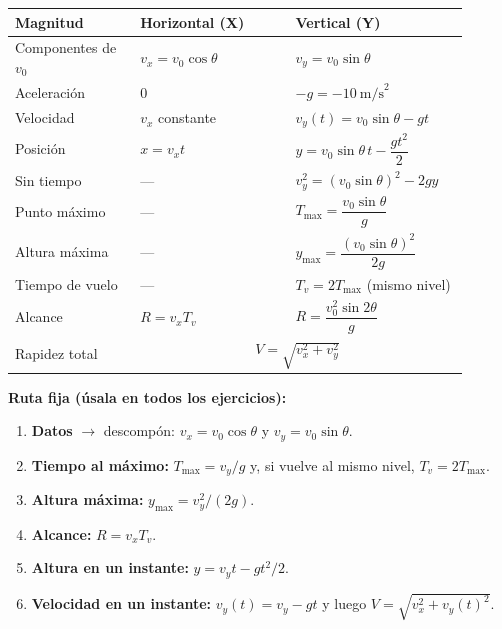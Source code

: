 \documentclass[12pt, letterpaper]{article}
\providecommand{\sen}{\sin}
\begin{document}
\begin{cuadroteoria}
  \small
  \begin{center}
  \begin{tabular}{@{}p{0.25\linewidth}p{0.31\linewidth}p{0.34\linewidth}@{}}
    \toprule
    \textbf{Magnitud} & \textbf{Horizontal (X)} & \textbf{Vertical (Y)} \\
    \midrule
    Componentes de $v_0$ & $v_x=v_0\cos\theta$ & $v_y=v_0\sen\theta$ \\[4pt]
    Aceleración & $0$ & $-g=-10\ \text{m/s}^2$ \\[4pt]
    Velocidad & $v_x$ constante & $v_y(t)=v_0\sen\theta-gt$ \\[4pt]
    Posición & $x=v_xt$ & $y=v_0\sen\theta\,t-\dfrac{g t^2}{2}$ \\[8pt]
    Sin tiempo & — & $v_y^2=(v_0\sen\theta)^2-2gy$ \\[4pt]
    Punto máximo & — & $T_{\max}=\dfrac{v_0\sen\theta}{g}$ \\[8pt]
    Altura máxima & — & $y_{\max}=\dfrac{(v_0\sen\theta)^2}{2g}$ \\[8pt]
    Tiempo de vuelo & — & $T_v=2T_{\max}$ (mismo nivel) \\[4pt]
    Alcance & $R=v_xT_v$ & $R=\dfrac{v_0^2\sen2\theta}{g}$ \\[8pt]
    Rapidez total & \multicolumn{2}{c}{$V=\sqrt{v_x^2+v_y^2}$} \\
    \bottomrule
  \end{tabular}
  \end{center}
\end{cuadroteoria}

\begin{cuadropasos}
  \small
  \textbf{Ruta fija (úsala en todos los ejercicios):}
  \begin{enumerate}[leftmargin=1.4em, nosep, topsep=2pt]
    \item \textbf{Datos} $\to$ descompón: $v_x=v_0\cos\theta$ y
          $v_y=v_0\sen\theta$.
    \item \textbf{Tiempo al máximo:} $T_{\max}=v_y/g$ y,
          si vuelve al mismo nivel, $T_v=2T_{\max}$.
    \item \textbf{Altura máxima:} $y_{\max}=v_y^2/(2g)$.
    \item \textbf{Alcance:} $R=v_xT_v$.
    \item \textbf{Altura en un instante:} $y=v_yt-gt^2/2$.
    \item \textbf{Velocidad en un instante:} $v_y(t)=v_y-gt$ y luego
          $V=\sqrt{v_x^2+v_y(t)^2}$.
  \end{enumerate}
\end{cuadropasos}
\end{document}
